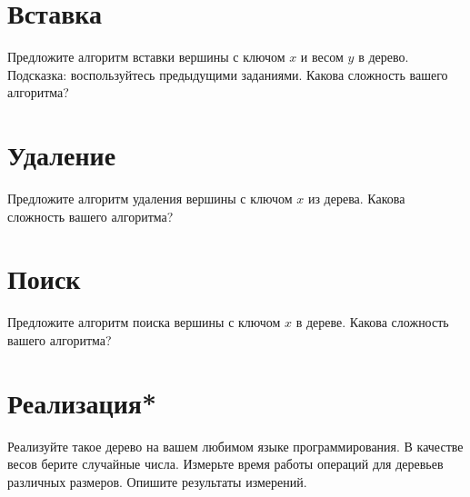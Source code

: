 \documentclass[12pt]{article}
\begin{document}
\section{\texorpdfstring{Вставка}{Task 4}}
Предложите алгоритм вставки вершины с ключом $x$ и весом $y$ в дерево.
Подсказка: воспользуйтесь предыдущими заданиями.
Какова сложность вашего алгоритма?

\section{\texorpdfstring{Удаление}{Task 5}}
Предложите алгоритм удаления вершины с ключом $x$ из дерева.
Какова сложность вашего алгоритма?

\section{\texorpdfstring{Поиск}{Task 6}}
Предложите алгоритм поиска вершины с ключом $x$ в дереве.
Какова сложность вашего алгоритма?

\section{\texorpdfstring{Реализация*}{Task 7}}
Реализуйте такое дерево на вашем любимом языке программирования. В качестве
весов берите случайные числа. Измерьте время работы операций для деревьев
различных размеров. Опишите результаты измерений.
\end{document}
